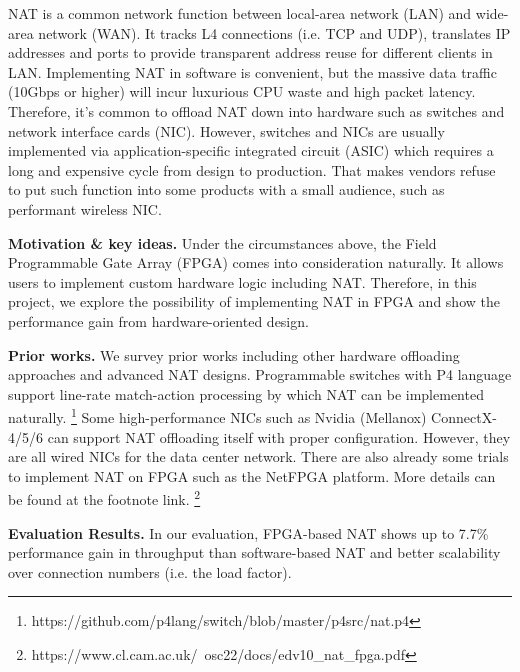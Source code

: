





NAT is a common network function between local-area network (LAN) and wide-area
network (WAN). 
It tracks L4 connections (i.e. TCP and UDP), translates IP addresses and ports to 
provide transparent address reuse for different clients in LAN.
Implementing NAT in software is convenient, but the massive data traffic (10Gbps or higher) will incur luxurious CPU waste and high packet latency. Therefore, it's common to offload NAT down into hardware such as switches and network interface cards (NIC). 
However, switches and NICs are usually implemented via application-specific integrated circuit (ASIC) which requires a long and expensive cycle from design to production. That makes vendors refuse to put such function into some products with a small audience, such as performant wireless NIC. 



\textbf{Motivation \& key ideas.} 
Under the circumstances above, the Field Programmable Gate Array (FPGA) comes into consideration naturally. 
It allows users to implement custom hardware logic including NAT. Therefore, in this project, we explore the possibility of implementing NAT in FPGA and show the performance gain from hardware-oriented design. 

\textbf{Prior works.} We survey prior works including other hardware offloading approaches and advanced NAT designs. Programmable switches with P4 language support line-rate match-action processing by which NAT can be implemented naturally. 
\footnote{https://github.com/p4lang/switch/blob/master/p4src/nat.p4}
Some high-performance NICs such as Nvidia (Mellanox) ConnectX-4/5/6 can support NAT offloading itself with proper configuration. However, they are all wired NICs for the data center network.
There are also already some trials to implement NAT on FPGA such as the NetFPGA platform. More details can be found at the footnote link.
\footnote{https://www.cl.cam.ac.uk/~osc22/docs/edv10\_nat\_fpga.pdf}

\textbf{Evaluation Results.} In our evaluation, FPGA-based NAT shows up to 7.7\% performance gain in throughput than software-based NAT and better scalability over connection numbers (i.e. the load factor).


